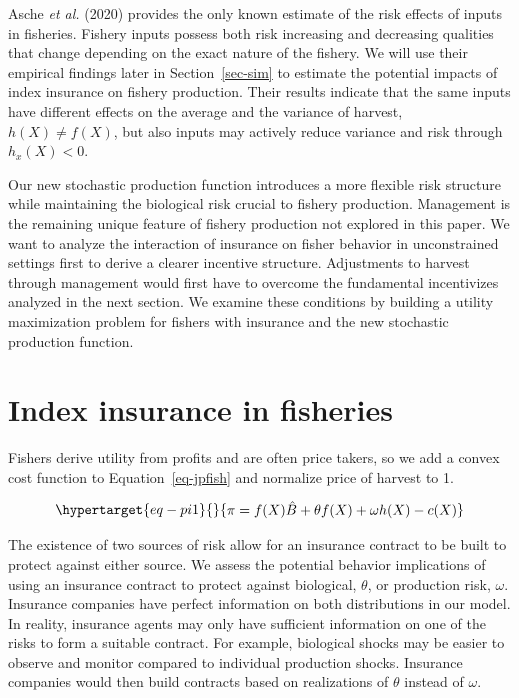 \documentclass[
  letterpaper,
  DIV=11,
  numbers=noendperiod]{scrartcl}
\theoremstyle{plain}
\theoremstyle{plain}
\theoremstyle{remark}
\begin{document}
Asche \emph{et al.} (2020) provides the only known estimate of the risk
effects of inputs in fisheries. Fishery inputs possess both risk
increasing and decreasing qualities that change depending on the exact
nature of the fishery. We will use their empirical findings later in
Section~\ref{sec-sim} to estimate the potential impacts of index
insurance on fishery production. Their results indicate that the same
inputs have different effects on the average and the variance of
harvest, \(h(X)\neq f(X)\), but also inputs may actively reduce variance
and risk through \(h_x(X)<0\).

Our new stochastic production function introduces a more flexible risk
structure while maintaining the biological risk crucial to fishery
production. Management is the remaining unique feature of fishery
production not explored in this paper. We want to analyze the
interaction of insurance on fisher behavior in unconstrained settings
first to derive a clearer incentive structure. Adjustments to harvest
through management would first have to overcome the fundamental
incentivizes analyzed in the next section. We examine these conditions
by building a utility maximization problem for fishers with insurance
and the new stochastic production function.

\hypertarget{sec-common}{%
\section{Index insurance in fisheries}\label{sec-common}}

Fishers derive utility from profits and are often price takers, so we
add a convex cost function to Equation~\ref{eq-jpfish} and normalize
price of harvest to 1.

\begin{equation}\protect\hypertarget{eq-pi1}{}{
\begin{aligned}
\pi=f(X)\hat{B}+\theta f(X)+\omega h(X)-c(X)
\end{aligned}
}\label{eq-pi1}\end{equation}

The existence of two sources of risk allow for an insurance contract to
be built to protect against either source. We assess the potential
behavior implications of using an insurance contract to protect against
biological, \(\theta\), or production risk, \(\omega\). Insurance
companies have perfect information on both distributions in our model.
In reality, insurance agents may only have sufficient information on one
of the risks to form a suitable contract. For example, biological shocks
may be easier to observe and monitor compared to individual production
shocks. Insurance companies would then build contracts based on
realizations of \(\theta\) instead of \(\omega\).
\end{document}
